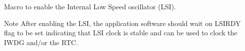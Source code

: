 Macro to enable the Internal Low Speed oscillator (L\-S\-I). 

\begin{DoxyNote}{Note}
After enabling the L\-S\-I, the application software should wait on L\-S\-I\-R\-D\-Y flag to be set indicating that L\-S\-I clock is stable and can be used to clock the I\-W\-D\-G and/or the R\-T\-C. 
\end{DoxyNote}
